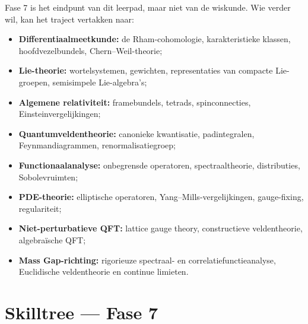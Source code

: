 \documentclass[11pt,a4paper]{article}
\begin{document}
Fase 7 is het eindpunt van dit leerpad, maar niet van de wiskunde. Wie verder wil, kan het traject vertakken naar:
\begin{itemize}
    \item \textbf{Differentiaalmeetkunde:} de Rham-cohomologie, karakteristieke klassen, hoofdvezelbundels, Chern--Weil-theorie;
    \item \textbf{Lie-theorie:} wortelsystemen, gewichten, representaties van compacte Lie-groepen, semisimpele Lie-algebra's;
    \item \textbf{Algemene relativiteit:} framebundels, tetrads, spinconnecties, Einsteinvergelijkingen;
    \item \textbf{Quantumveldentheorie:} canonieke kwantisatie, padintegralen, Feynmandiagrammen, renormalisatiegroep;
    \item \textbf{Functionaalanalyse:} onbegrensde operatoren, spectraaltheorie, distributies, Sobolevruimten;
    \item \textbf{PDE-theorie:} elliptische operatoren, Yang--Mills-vergelijkingen, gauge-fixing, regulariteit;
    \item \textbf{Niet-perturbatieve QFT:} lattice gauge theory, constructieve veldentheorie, algebraïsche QFT;
    \item \textbf{Mass Gap-richting:} rigorieuze spectraal- en correlatiefunctieanalyse, Euclidische veldentheorie en continue limieten.
\end{itemize}

\section{Skilltree --- Fase 7}

\begin{center}
\end{center}
\end{document}
